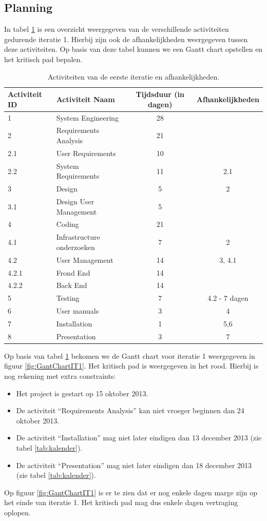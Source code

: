 \subsection{Planning}
In tabel \ref{tab:ActivityDependenciesIteratie1} is een overzicht weergegeven van de verschillende activiteiten gedurende iteratie 1. Hierbij zijn ook de afhankelijkheden weergegeven tussen deze activiteiten. Op basis van deze tabel kunnen we een Gantt chart opstellen en het kritisch pad bepalen.
\begin{table} [H]
	\centering
	\caption{Activiteiten van de eerste iteratie en afhankelijkheden.}
	\begin{tabular} {l|l|c|c}
		Activiteit ID & Activiteit Naam & Tijdsduur (in dagen) & Afhankelijkheden \\
		\hline
		1 	& System Engineering 		& 28 & \\
		2 	& Requirements Analysis 	& 21 & \\
		2.1 & User Requirements 		& 10 & \\
		2.2 & System Requirements 		& 11 & 2.1 \\
		3 	& Design 					& 5 & 2 \\
		3.1 & Design User Management 	& 5 & \\
		4 	& Coding 					& 21 & \\
		4.1 & Infrastructure onderzoeken & 7 & 2\\
		4.2 & User Management			& 14 & 3, 4.1  \\
		4.2.1 & Frond End 		 		& 14 & \\
		4.2.2 & Back End				& 14 & \\
		5 	& Testing 					& 7 & 4.2 - 7 dagen \\
		6 	& User manuals 				& 3 & 4 \\
		7 	& Installation 				& 1 & 5,6 \\
		8 	& Presentation 				& 3 & 7	
	\end{tabular}
	\label{tab:ActivityDependenciesIteratie1}
\end{table}
Op basis van tabel \ref{tab:ActivityDependenciesIteratie1} bekomen we de Gantt chart voor iteratie 1 weergegeven in figuur \ref{fig:GantChartIT1}. Het kritisch pad is weergegeven in het rood. Hierbij is nog rekening met extra constraints:
\begin{itemize}
	\item Het project is gestart op 15 oktober 2013.
	\item De activiteit ``Requirements Analysis'' kan niet vroeger beginnen dan 24 oktober 2013.
	\item De activiteit ``Installation'' mag niet later eindigen dan 13 december 2013 (zie tabel \ref{tab:kalender}).
	\item De activiteit ``Presentation'' mag niet later eindigen dan 18 december 2013 (zie tabel \ref{tab:kalender}).
\end{itemize}
Op figuur \ref{fig:GantChartIT1} is er te zien dat er nog enkele dagen marge zijn op het einde van iteratie 1. Het kritisch pad mag dus enkele dagen vertraging oplopen.

